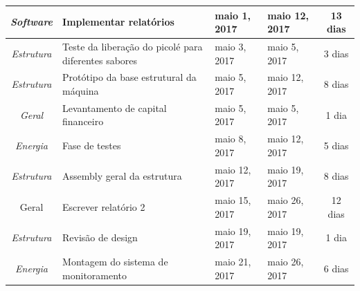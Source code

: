 \begin{longtable}{|c|m{6.5cm}|m{3.2cm}|m{3.2cm}|c|}
\textit{Software}                                                         & Implementar relatórios                               & maio 1, 2017                         & maio 12, 2017                     & 13 dias                               \\ \hline
\textit{Estrutura}                                                        & Teste da liberação do picolé para diferentes sabores & maio 3, 2017                         & maio 5, 2017                      & 3 dias                                \\ \hline
\textit{Estrutura}                                                        & Protótipo da base estrutural da máquina             & maio 5, 2017                         & maio 12, 2017                     & 8 dias                                \\ \hline
\textit{Geral}                                                            & Levantamento de capital financeiro                   & maio 5, 2017                         & maio 5, 2017                      & 1 dia                                 \\ \hline
\textit{Energia}                                                          & Fase de testes                                       & maio 8, 2017                         & maio 12, 2017                     & 5 dias                                \\ \hline
\textit{Estrutura}                                                        & Assembly geral da estrutura                          & maio 12, 2017                        & maio 19, 2017                     & 8 dias                                \\ \hline
Geral                                                                     & Escrever relatório 2                                 & maio 15, 2017                        & maio 26, 2017                     & 12 dias                               \\ \hline
\textit{Estrutura}                                                        & Revisão de design                                    & maio 19, 2017                        & maio 19, 2017                     & 1 dia                                 \\ \hline
\textit{Energia}                                                          & Montagem do sistema de monitoramento                 & maio 21, 2017                        & maio 26, 2017                     & 6 dias                                \\ \hline

\end{longtable}
